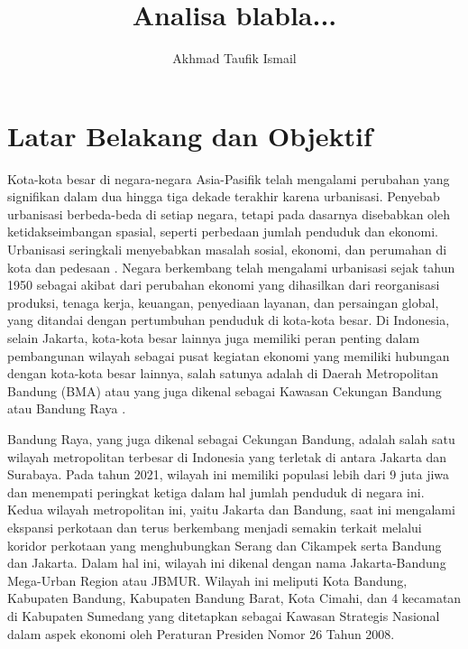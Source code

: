\documentclass{article}
\begin{document}
\title{Analisa blabla...}
\author{Akhmad Taufik Ismail}
\maketitle

\section{Latar Belakang dan Objektif} \par

Kota-kota besar di negara-negara Asia-Pasifik telah mengalami perubahan yang signifikan dalam dua hingga tiga dekade terakhir karena urbanisasi. Penyebab urbanisasi berbeda-beda di setiap negara, tetapi pada dasarnya disebabkan oleh ketidakseimbangan spasial, seperti perbedaan jumlah penduduk dan ekonomi. Urbanisasi seringkali menyebabkan masalah sosial, ekonomi, dan perumahan di kota dan pedesaan \cite{Rustiadi2009}. Negara berkembang telah mengalami urbanisasi sejak tahun 1950 sebagai akibat dari perubahan ekonomi yang dihasilkan dari reorganisasi produksi, tenaga kerja, keuangan, penyediaan layanan, dan persaingan global, yang ditandai dengan pertumbuhan penduduk di kota-kota besar. Di Indonesia, selain Jakarta, kota-kota besar lainnya juga memiliki peran penting dalam pembangunan wilayah sebagai pusat kegiatan ekonomi yang memiliki hubungan dengan kota-kota besar lainnya, salah satunya adalah di Daerah Metropolitan Bandung (BMA) atau yang juga dikenal sebagai Kawasan Cekungan Bandung atau Bandung Raya \cite{Fuadina2021}. \par

Bandung Raya, yang juga dikenal sebagai Cekungan Bandung, adalah salah satu wilayah metropolitan terbesar di Indonesia yang terletak di antara Jakarta dan Surabaya. Pada tahun 2021, wilayah ini memiliki populasi lebih dari 9 juta jiwa \cite{BPS_Kota_Bandung_2022} \cite{BPS_Kota_Cimahi_2022} \cite{BPS_Kabupaten_Bandung_2022} \cite{BPS_Kabupaten_Bandung_Barat_2022} \cite{BPS_Kabupaten_Sumedang_2022} dan menempati peringkat ketiga dalam hal jumlah penduduk di negara ini. Kedua wilayah metropolitan ini, yaitu Jakarta dan Bandung, saat ini mengalami ekspansi perkotaan dan terus berkembang menjadi semakin terkait melalui koridor perkotaan yang menghubungkan Serang dan Cikampek serta Bandung dan Jakarta. Dalam hal ini, wilayah ini dikenal dengan nama Jakarta-Bandung Mega-Urban Region atau JBMUR. Wilayah ini meliputi Kota Bandung, Kabupaten Bandung, Kabupaten Bandung Barat, Kota Cimahi, dan 4 kecamatan di Kabupaten Sumedang yang ditetapkan sebagai Kawasan Strategis Nasional dalam aspek ekonomi oleh Peraturan Presiden Nomor 26 Tahun 2008. \par
\end{document}
